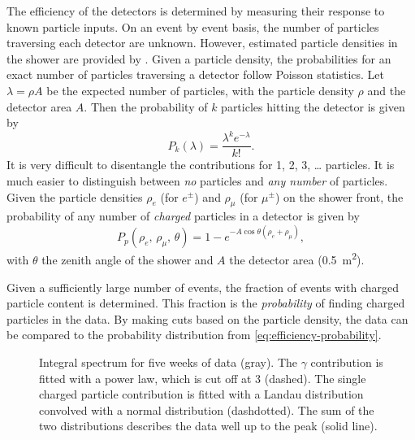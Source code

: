 The efficiency of the detectors is determined by measuring their response to
known particle inputs.  On an event by event basis, the number of particles
traversing each detector are unknown.  However, estimated particle densities in
the shower are provided by \kascade.  Given a particle density, the
probabilities for an exact number of particles traversing a detector follow
Poisson statistics.  Let $\lambda = \rho A$ be the expected number of particles,
with the particle density $\rho$ and the detector area $A$.
Then the probability of $k$ particles hitting the detector is given by
\begin{equation}
P_k(\lambda) = \frac{\lambda^k e^{-\lambda}}{k!}.
\end{equation}
It is very difficult to disentangle the contributions for 1, 2, 3, \ldots
particles.  It is much easier to distinguish between \emph{no} particles and
\emph{any number} of particles.  Given the particle densities $\rho_e$ (for
$e^\pm$) and $\rho_\mu$ (for $\mu^\pm$) on the shower front, the probability of
any number of \emph{charged} particles in a \hisparc detector is given by
\begin{equation}
\label{eq:efficiency-probability}
P_p(\rho_e,\, \rho_\mu,\, \theta) = 1 - e^{-A \cos\theta (\rho_e +
\rho_\mu)},
\end{equation}
with $\theta$ the zenith angle of the shower and $A$ the detector area
(\SI{0.5}{\meter\squared}).

Given a sufficiently large number of events, the
fraction of events with charged particle content is determined.  This fraction
is the \emph{probability} of finding charged particles in the data.  By making
cuts based on the particle density, the data can be compared to the probability distribution
from \eqref{eq:efficiency-probability}.

\begin{figure}
\centering

\caption{Integral spectrum for five weeks of data (gray).  The $\gamma$
contribution is fitted with a power law, which is cut off at \SI{3}{\mip}
(dashed).  The single charged particle contribution is fitted with a
Landau distribution convolved with a normal distribution (dashdotted).
The sum of the two distributions describes the data well up to the \mip
peak (solid line).}
\label{fig:efficiency-spectrum-fit}
\end{figure}

